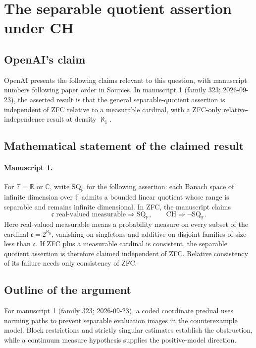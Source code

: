 \documentclass[11pt]{article}
\begin{document}
\section*{The separable quotient assertion under CH}

\subsection{OpenAI's claim}
OpenAI presents the following claims relevant to this question, with manuscript numbers following paper order in Sources. In manuscript 1 (family 323; 2026-09-23), the asserted result is that the general separable-quotient assertion is independent of ZFC relative to a measurable cardinal, with a ZFC-only relative-independence result at density $\aleph_1$.

\subsection{Mathematical statement of the claimed result}
\paragraph{Manuscript 1.}
For $\mathbb F=\mathbb R$ or $\mathbb C$, write $\mathrm{SQ}_{\mathbb F}$ for the following assertion: each Banach space of infinite dimension over $\mathbb F$ admits a bounded linear quotient whose range is separable and remains infinite dimensional. In ZFC, the manuscript claims
\[
 \mathfrak c\text{ real-valued measurable}\Rightarrow\mathrm{SQ}_{\mathbb F},
 \qquad\mathrm{CH}\Rightarrow\neg\mathrm{SQ}_{\mathbb F}.
\]
Here real-valued measurable means a probability measure on every subset of the cardinal $\mathfrak c=2^{\aleph_0}$, vanishing on singletons and additive on disjoint families of size less than $\mathfrak c$. If ZFC plus a measurable cardinal is consistent, the separable quotient assertion is therefore claimed independent of ZFC. Relative consistency of its failure needs only consistency of ZFC.

\subsection{Outline of the argument}
For manuscript 1 (family 323; 2026-09-23), a coded coordinate predual uses norming paths to prevent separable evaluation images in the counterexample model. Block restrictions and strictly singular estimates establish the obstruction, while a continuum measure hypothesis supplies the positive-model direction.
\end{document}
